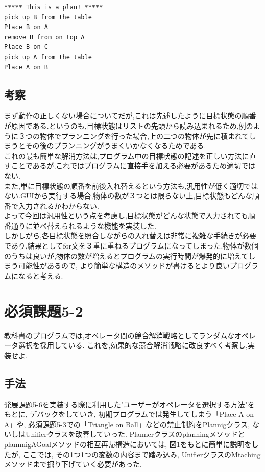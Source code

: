 \documentclass[uplatex,12pt]{jsarticle}
\begin{document}
\begin{lstlisting}[caption=実行結果, label=mid]
***** This is a plan! *****
pick up B from the table
Place B on A
remove B from on top A
Place B on C
pick up A from the table
Place A on B
\end{lstlisting}

\subsection{考察}
まず動作の正しくない場合についてだが,これは先述したように目標状態の順番が原因である.というのも,目標状態はリストの先頭から読み込まれるため,例のように３つの物体でプランニングを行った場合,上の二つの物体が先に積まれてしまうとその後のプランニングがうまくいかなくなるためである.\\
これの最も簡単な解消方法は,プログラム中の目標状態の記述を正しい方法に直すことであるが,これではプログラムに直接手を加える必要があるため適切ではない.\\
また,単に目標状態の順番を前後入れ替えるという方法も,汎用性が低く適切ではない.GUIから実行する場合,物体の数が３つとは限らない上,目標状態もどんな順番で入力されるかわからない.\\
よって今回は汎用性という点を考慮し,目標状態がどんな状態で入力されても順番通りに並べ替えられるような機能を実装した.\\
しかしがら,各目標状態を照合しながらの入れ替えは非常に複雑な手続きが必要であり,結果としてfor文を３重に重ねるプログラムになってしまった.物体が数個のうちは良いが,物体の数が増えるとプログラムの実行時間が爆発的に増えてしまう可能性があるので, より簡単な構造のメソッドが書けるとより良いプログラムになると考える.


\section{必須課題5-2}
\begin{screen}
教科書のプログラムでは,オペレータ間の競合解消戦略としてランダムなオペレータ選択を採用している.
これを,効果的な競合解消戦略に改良すべく考察し,実装せよ.
\end{screen}
\subsection{手法}
発展課題5-6を実装する際に利用した"ユーザーがオペレータを選択する方法"をもとに, デバックをしていき, 初期プログラムでは発生してしまう「Place A on A」や,  必須課題5-3での「Triangle on Ball」などの禁止制約をPlannigクラス, ないしはUnifierクラスを改善していった. PlannerクラスのplanningメソッドとplannnigAGoalメソッドの相互再帰構造においては, 図1をもとに簡単に説明をしたが, ここでは, その1つ1つの変数の内容まで踏み込み, UnifierクラスのMtachingメソッドまで掘り下げていく必要があった. \\
\end{document}
